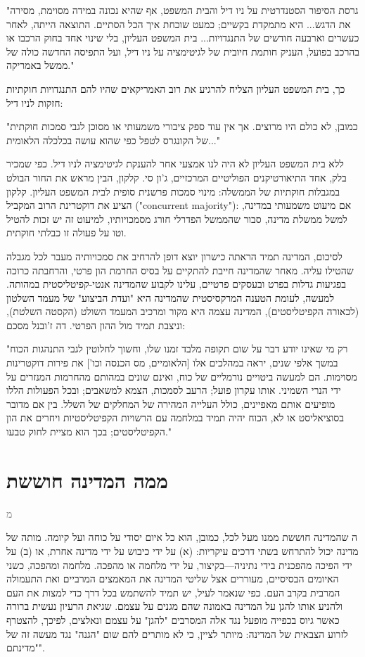 \documentclass[12pt,oneside]{book}
\newcommand{\hebrewchapter}[2]{%
  \chapter*{#1}%
  \addcontentsline{toc}{chapter}{#1}%
  \lettrine[lines=4, lhang=0.1, loversize=0.5, findent=0pt]{\textcolor{gray} #2}{}%
}
\begin{document}
\begin{quoting}
"גרסת הסיפור הסטנדרטית על ניו דיל והבית המשפט, אף שהיא נכונה במידה מסוימת, מסירה את הדגש... היא מתמקדת בקשיים; כמעט שוכחת איך הכל הסתיים. התוצאה הייתה, לאחר כעשרים וארבעה חודשים של התנגדויות... בית המשפט העליון, בלי שינוי אחד בחוק הרכבו או בהרכב בפועל, העניק חותמת חיובית של לגיטימציה על ניו דיל, ועל התפיסה החדשה כולה של ממשל באמריקה."
\end{quoting}

כך, בית המשפט העליון הצליח להרגיע את רוב האמריקאים שהיו להם התנגדויות חוקתיות חזקות לניו דיל:

\begin{quoting}
"כמובן, לא כולם היו מרוצים. אך אין עוד ספק ציבורי משמעותי או מסוכן לגבי סמכות חוקתית של הקונגרס לטפל כפי שהוא עושה בכלכלה הלאומית..."
\end{quoting}

ללא בית המשפט העליון לא היה לנו אמצעי אחר להענקת לגיטימציה לניו דיל. כפי שמכיר בלק, אחד התיאורטיקנים הפוליטיים המרכזיים, ג'ון סי. קלקון, הבין מראש את החור הבולט במגבלות חוקתיות של הממשלה: מינוי סמכות פרשנית סופית לבית המשפט העליון. קלקון הציע את דוקטרינת הרוב המקביל ("concurrent majority"): אם מיעוט משמעותי במדינה, למשל ממשלת מדינה, סבור שהממשל הפדרלי חורג מסמכויותיו, למיעוט זה יש זכות להטיל וטו על פעולה זו כבלתי חוקתית.

לסיכום, המדינה תמיד הראתה כישרון יוצא דופן להרחיב את סמכויותיה מעבר לכל מגבלה שהטילו עליה. מאחר שהמדינה חייבת להתקיים על בסיס החרמת הון פרטי, והרחבתה כרוכה בפגיעות גדלות בפרט ובעסקים פרטיים, עלינו לקבוע שהמדינה אנטי-קפיטליסטית במהותה. למעשה, לעומת הטענה המרקסיסטית שהמדינה היא "ועדת הביצוע" של מעמד השלטון (לכאורה הקפיטליסטים), המדינה עצמה היא מקור ומרכיב המעמד השולט (הקסטה השלטת), וניצבת תמיד מול ההון הפרטי. דה ז'ובנל מסכם:

\begin{quoting}
"רק מי שאינו יודע דבר על שום תקופה מלבד זמנו שלו, וחשוך לחלוטין לגבי התנהגות הכוח במשך אלפי שנים, יראה במהלכים אלו [הלאומיים, מס הכנסה וכו'] את פירות דוקטרינות מסוימות. הם למעשה ביטויים נורמליים של כוח, ואינם שונים במהותם מהחרמות המנזרים על ידי הנרי השמיני. אותו עקרון פועל; הרעב לסמכות, הצמא למשאבים; ובכל הפעולות הללו מופיעים אותם מאפיינים, כולל העלייה המהירה של המחלקים של השלל. בין אם מדובר בסוציאליסט או לא, הכוח יהיה תמיד במלחמה עם הרשויות הקפיטליסטיות ויחרים את הון הקפיטליסטים; בכך הוא מציית לחוק טבעו."
\end{quoting}

\hebrewchapter{ממה המדינה חוששת}{מ}
ה שהמדינה חוששת ממנו מעל לכל, כמובן, הוא כל איום יסודי על כוחה ועל קיומה. מותה של מדינה יכול להתרחש בשתי דרכים עיקריות: (א) על ידי כיבוש על ידי מדינה אחרת, או (ב) על ידי הפיכה מהפכנית בידי נתיניה—בקיצור, על ידי מלחמה או מהפכה. מלחמה ומהפכה, כשני האיומים הבסיסיים, מעוררים אצל שליטי המדינה את המאמצים המרביים ואת התעמולה המרבית בקרב העם. כפי שנאמר לעיל, יש תמיד להשתמש בכל דרך כדי למצות את העם ולהניע אותו להגן על המדינה באמונה שהם מגנים על עצמם. שגיאת הרעיון נעשית ברורה כאשר גיוס בכפייה מופעל נגד אלה המסרבים "להגן" על עצמם ונאלצים, לפיכך, להצטרף לזרוע הצבאית של המדינה: מיותר לציין, כי לא מותרים להם שום "הגנה" נגד מעשה זה של "מדינתם".
\end{document}
